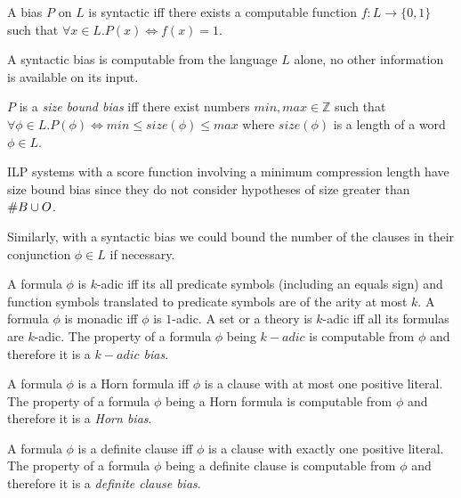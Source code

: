 \begin{defn}
A bias $P$ on $L$ is syntactic iff there exists a computable function $f:L \to \{0,1\}$ such that $\forall x \in L.P(x) \iff f(x)=1$.
\end{defn}

\begin{remark}
A syntactic bias is computable from the language $L$ alone, no other information is available on its input.
\end{remark}

\begin{defn}
$P$ is a \emph{size bound bias} iff there exist numbers $min, max \in \mathbb{Z}$ such that $\forall \phi \in L. P(\phi) \iff min \le size(\phi) \le max$ where $size(\phi)$ is a length of a word $\phi \in L$.
\end{defn}

\begin{remark}
ILP systems with a score function involving a minimum compression length have size bound bias since they do not consider hypotheses of size greater than $\#B \cup O$.
\end{remark}

\begin{remark}
Similarly, with a syntactic bias we could bound the number of the clauses in their conjunction $\phi \in L$ if necessary.
\end{remark}

\begin{defn}
A formula $\phi$ is $k$-adic iff its all predicate symbols (including an equals sign) and function symbols translated to predicate symbols are of the arity at most $k$. A formula $\phi$ is monadic iff $\phi$ is $1$-adic. A set or a theory is $k$-adic iff all its formulas are $k$-adic. The property of a formula $\phi$ being $k-adic$ is computable from $\phi$ and therefore it is a \emph{$k-adic$ bias}.
\end{defn}

\begin{defn}
A formula $\phi$ is a Horn formula iff $\phi$ is a clause with at most one positive literal. The property of a formula $\phi$ being a Horn formula is computable from $\phi$ and therefore it is a \emph{Horn bias}.
\end{defn}

\begin{defn}
A formula $\phi$ is a definite clause iff $\phi$ is a clause with exactly one positive literal. The property of a formula $\phi$ being a definite clause is computable from $\phi$ and therefore it is a \emph{definite clause bias}.
\end{defn}

